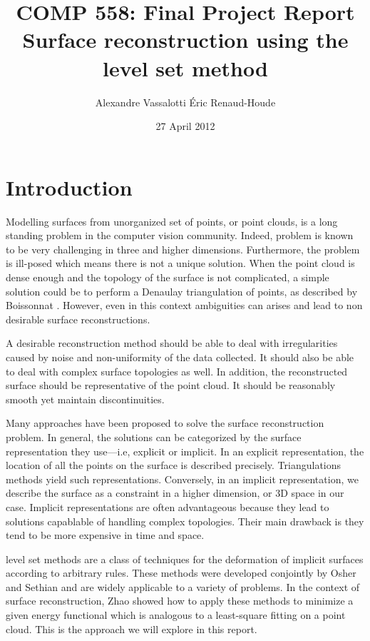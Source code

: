 \documentclass{article}
\author{Alexandre Vassalotti \quad \'{E}ric Renaud-Houde}
\title{COMP 558: Final Project Report \\
  \large \textbf{Surface reconstruction using the level set method}
}
\date{27 April 2012}
\begin{document}
\maketitle
\section{Introduction}
Modelling surfaces from unorganized set of points, or point clouds, is a long
standing problem in the computer vision community. Indeed, problem is known to
be very challenging in three and higher dimensions. Furthermore, the problem
is ill-posed which means there is not a unique solution. When the point cloud
is dense enough and the topology of the surface is not complicated, a simple
solution could be to perform a Denaulay triangulation of points, as
described by Boissonnat \cite{boissonnat1984geometric}. However, even in this
context ambiguities can arises and lead to non desirable surface
reconstructions.

A desirable reconstruction method should be able to deal with irregularities
caused by noise and non-uniformity of the data collected. It should also be
able to deal with complex surface topologies as well. In addition, the
reconstructed surface should be representative of the point cloud. It should
be reasonably smooth yet maintain discontinuities.

Many approaches have been proposed to solve the surface reconstruction
problem. In general, the solutions can be categorized by the surface
representation they use---i.e, explicit or implicit. In an explicit
representation, the location of all the points on the surface is described
precisely. Triangulations methods yield such representations. Conversely, in
an implicit representation, we describe the surface as a constraint in a
higher dimension, or 3D space in our case. Implicit representations are often
advantageous because they lead to solutions capablable of handling complex
topologies. Their main drawback is they tend to be more expensive in time and
space.

level set methods are a class of techniques for the deformation of implicit
surfaces according to arbitrary rules. These methods were developed conjointly
by Osher and Sethian \cite{sethian1999level} and are widely applicable to a
variety of problems. In the context of surface reconstruction, Zhao showed
\cite{zhao2001fast} how to apply these methods to minimize a given energy
functional which is analogous to a least-square fitting on a point cloud. This
is the approach we will explore in this report.
\end{document}
